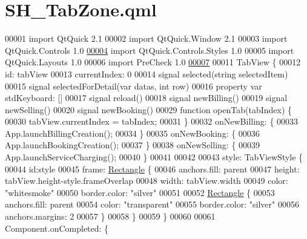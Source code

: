 \hypertarget{SH__TabZone_8qml}{\section{S\-H\-\_\-\-Tab\-Zone.\-qml}
\label{SH__TabZone_8qml}
}

\begin{DoxyCode}
00001 \textcolor{keyword}{import} QtQuick 2.1
00002 import QtQuick.Window 2.1
00003 import QtQuick.Controls 1.0
\hypertarget{SH__TabZone_8qml_source_l00004}{}\hyperlink{classSH__TabZone}{00004} import QtQuick.Controls.Styles 1.0
00005 import QtQuick.Layouts 1.0
00006 import PreCheck 1.0
\hypertarget{SH__TabZone_8qml_source_l00007}{}\hyperlink{classSH__TabZone_a23223ca4d8158e2f50564d92364f6e14}{00007} 
00011 TabView \{
00012     \textcolor{keywordtype}{id}: tabView
00013     currentIndex: 0
00014     signal selected(\textcolor{keywordtype}{string} selectedItem)
00015     signal selectedForDetail(var datas, \textcolor{keywordtype}{int} row)
00016     \textcolor{keyword}{property} var stdKeyboard: []
00017     signal reload()
00018     signal newBilling()
00019     signal newSelling()
00020     signal newBooking()
00029     \textcolor{keyword}{function} openTab(tabIndex) \{
00030         tabView.currentIndex = tabIndex;
00031     \}
00032     onNewBilling: \{
00033         App.launchBillingCreation();
00034     \}
00035     onNewBooking: \{
00036         App.launchBookingCreation();
00037     \}
00038     onNewSelling: \{
00039         App.launchServiceCharging();
00040     \}
00041 
00042 
00043     style: TabViewStyle \{
00044         \textcolor{keywordtype}{id}:style
00045         frame: \hyperlink{classRectangle}{Rectangle} \{
00046             anchors.fill: parent
00047             height: tabView.height-style.frameOverlap
00048             width: tabView.width
00049             color: \textcolor{stringliteral}{"whitesmoke"}
00050             border.color: \textcolor{stringliteral}{"silver"}
00051 
00052             \hyperlink{classRectangle}{Rectangle} \{
00053                 anchors.fill: parent
00054                 color: \textcolor{stringliteral}{"transparent"}
00055                 border.color: \textcolor{stringliteral}{"silver"}
00056                 anchors.margins: 2
00057             \}
00058         \}
00059     \}
00060 
00061     Component.onCompleted: \{

\end{DoxyCode}
